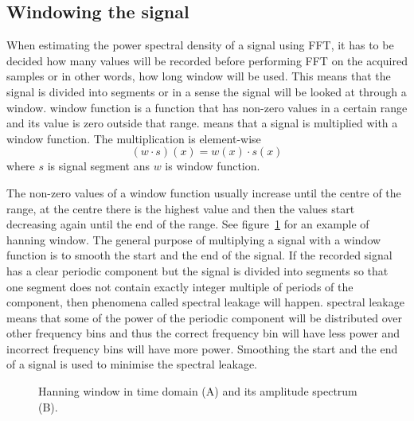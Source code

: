\subsection{Windowing the signal}
\label{sec:window}

When estimating the \gls{power spectral density} of a signal using \gls{FFT}, it has to be decided how many values will be recorded before performing \gls{FFT} on the acquired samples or in other words, how long \gls{window} will be used. This means that the signal is divided into segments or in a sense the signal will be looked at through a window. \Gls{window} function is a function that has non-zero values in a certain range and its value is zero outside that range.  means that a signal is multiplied with a \gls{window} function. The multiplication is element-wise
\begin{equation}
	(w\cdot s)(x)=w(x)\cdot s(x)
\end{equation}
where $s$ is signal segment ans $w$ is \gls{window} function.

The non-zero values of a \gls{window} function usually increase until the centre of the range, at the centre there is the highest value and then the values start decreasing again until the end of the range. See figure~\ref{fig:hanning_window} for an example of hanning \gls{window}. The general purpose of multiplying a signal with a \gls{window} function is to smooth the start and the end of the signal. If the recorded signal has a clear periodic component but the signal is divided into segments so that one segment does not contain exactly integer multiple of periods of the component, then phenomena called \gls{spectral leakage} will happen. \Gls{spectral leakage} means that some of the power of the periodic component will be distributed over other \glspl{frequency bin} and thus the correct \gls{frequency bin} will have less power and incorrect \glspl{frequency bin} will have more power. Smoothing the start and the end of a signal is used to minimise the \gls{spectral leakage}.

\begin{figure}[h!]
	
	\caption{Hanning window in time domain (A) and its amplitude spectrum (B).}
	\label{fig:hanning_window}
\end{figure}

